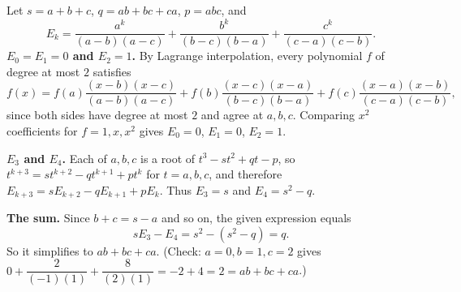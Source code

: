 Let $s=a+b+c$, $q=ab+bc+ca$, $p=abc$, and
\[
E_k=\dfrac{a^k}{(a-b)(a-c)}+\dfrac{b^k}{(b-c)(b-a)}+\dfrac{c^k}{(c-a)(c-b)} .
\]
\textbf{$E_0=E_1=0$ and $E_2=1$.} By Lagrange interpolation, every polynomial $f$ of degree at most $2$ satisfies
\[
f(x)=f(a)\dfrac{(x-b)(x-c)}{(a-b)(a-c)}+f(b)\dfrac{(x-c)(x-a)}{(b-c)(b-a)}+f(c)\dfrac{(x-a)(x-b)}{(c-a)(c-b)},
\]
since both sides have degree at most $2$ and agree at $a,b,c$. Comparing $x^2$ coefficients for $f=1,x,x^2$ gives $E_0=0$, $E_1=0$, $E_2=1$.

\textbf{$E_3$ and $E_4$.} Each of $a,b,c$ is a root of $t^3-st^2+qt-p$, so $t^{k+3}=st^{k+2}-qt^{k+1}+pt^k$ for $t=a,b,c$, and therefore $E_{k+3}=sE_{k+2}-qE_{k+1}+pE_k$. Thus $E_3=s$ and $E_4=s^2-q$.

\textbf{The sum.} Since $b+c=s-a$ and so on, the given expression equals
\[
sE_3-E_4=s^2-(s^2-q)=q .
\]
So it simplifies to $\boxed{ab+bc+ca}$. (Check: $a=0,b=1,c=2$ gives $0+\dfrac{2}{(-1)(1)}+\dfrac{8}{(2)(1)}=-2+4=2=ab+bc+ca$.)
